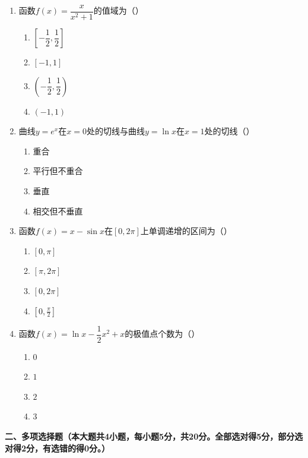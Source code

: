 \documentclass[12pt, a4paper]{ctexart}
\begin{document}
\begin{enumerate}[label=\Alph*.]
\item 函数$f(x)=\dfrac{x}{x^2+1}$的值域为（\quad）
\begin{enumerate}[label=]
\item $\left[-\dfrac{1}{2},\dfrac{1}{2}\right]$ \qquad \item $[-1,1]$ \qquad \item $\left(-\dfrac{1}{2},\dfrac{1}{2}\right)$ \qquad \item $(-1,1)$
\end{enumerate}

\item 曲线$y=e^x$在$x=0$处的切线与曲线$y=\ln x$在$x=1$处的切线（\quad）
\begin{enumerate}[label=]
\item 重合 \qquad \item 平行但不重合 \qquad \item 垂直 \qquad \item 相交但不垂直
\end{enumerate}

\item 函数$f(x)=x-\sin x$在$[0,2\pi]$上单调递增的区间为（\quad）
\begin{enumerate}[label=]
\item $[0,\pi]$ \qquad \item $[\pi,2\pi]$ \qquad \item $[0,2\pi]$ \qquad \item $[0,\frac{\pi}{2}]$
\end{enumerate}

\item 函数$f(x)=\ln x-\dfrac{1}{2}x^2+x$的极值点个数为（\quad）
\begin{enumerate}[label=]
\item $0$ \qquad \item $1$ \qquad \item $2$ \qquad \item $3$
\end{enumerate}

\end{enumerate}

\vspace{0.5em}

\noindent\textbf{二、多项选择题（本大题共4小题，每小题5分，共20分。全部选对得5分，部分选对得2分，有选错的得0分。）}
\end{document}
